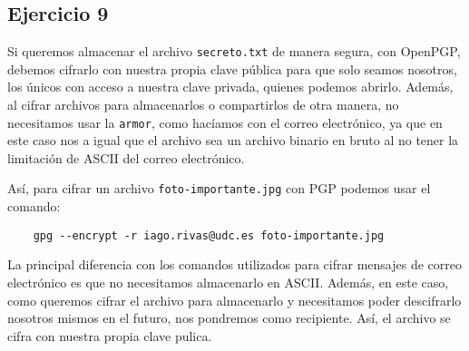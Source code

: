 \subsection{Ejercicio 9}
\graphicspath{ {img/09} }

Si queremos almacenar el archivo \texttt{secreto.txt} de manera segura, con OpenPGP, debemos cifrarlo con nuestra propia clave pública para que solo seamos nosotros, los únicos con acceso a nuestra clave privada, quienes podemos abrirlo. Además, al cifrar archivos para almacenarlos o compartirlos de otra manera, no necesitamos usar la \texttt{armor}, como hacíamos con el correo electrónico, ya que en este caso nos a igual que el archivo sea un archivo binario en bruto al no tener la limitación de ASCII del correo electrónico.

Así, para cifrar un archivo \texttt{foto-importante.jpg} con PGP podemos usar el comando:

\begin{verbatim}
    gpg --encrypt -r iago.rivas@udc.es foto-importante.jpg
\end{verbatim}

La principal diferencia con los comandos utilizados para cifrar mensajes de correo electrónico es que no necesitamos almacenarlo en ASCII. Además, en este caso, como queremos cifrar el archivo para almacenarlo y necesitamos poder descifrarlo nosotros mismos en el futuro, nos pondremos como recipiente. Así, el archivo se cifra con nuestra propia clave pulica.